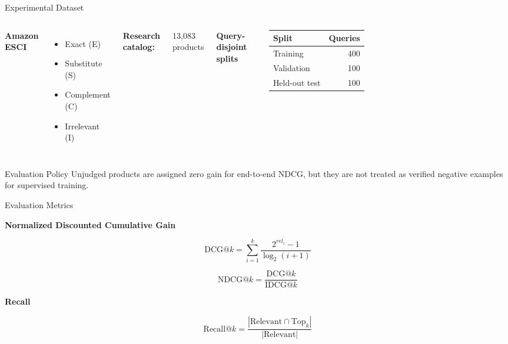 \documentclass[aspectratio=169,11pt]{beamer}
\begin{document}
\begin{frame}{Experimental Dataset}

\begin{columns}


\textbf{Amazon ESCI}

\begin{itemize}
\item Exact (E)
\item Substitute (S)
\item Complement (C)
\item Irrelevant (I)
\end{itemize}

\vspace{0.3cm}

\textbf{Research catalog:}

13,083 products


\textbf{Query-disjoint splits}

\begin{tabular}{lr}
\toprule
Split & Queries\\
\midrule
Training & 400\\
Validation & 100\\
Held-out test & 100\\
\bottomrule
\end{tabular}

\end{columns}

\vspace{0.4cm}

\begin{block}{Evaluation Policy}
Unjudged products are assigned zero gain
for end-to-end NDCG, but they are not
treated as verified negative examples
for supervised training.
\end{block}

\end{frame}

\begin{frame}{Evaluation Metrics}

\textbf{Normalized Discounted
Cumulative Gain}

\[
\mathrm{DCG}@k=
\sum_{i=1}^{k}
\frac{2^{rel_i}-1}
{\log_2(i+1)}
\]

\[
\mathrm{NDCG}@k=
\frac{
\mathrm{DCG}@k
}{
\mathrm{IDCG}@k
}
\]

\vspace{0.35cm}

\textbf{Recall}

\[
\mathrm{Recall}@k=
\frac{
|\mathrm{Relevant}
\cap\mathrm{Top}_k|
}{
|\mathrm{Relevant}|
}
\]

\end{frame}
\end{document}
